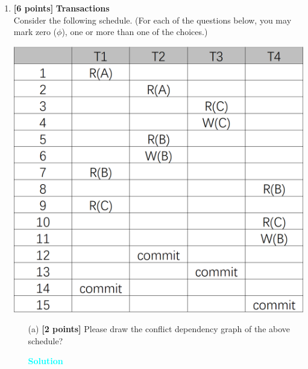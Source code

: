\documentclass[10pt]{article}
\newenvironment{solution}
    { \begin{mdframed}[backgroundcolor=gray!10] \textcolor{cyan}{\textbf{Solution}} \\}
    {  \end{mdframed}}
\begin{document}
\begin{enumerate}

	\item \textbf{[6 points]} \textbf{Transactions} \\
	      Consider the following schedule. (For each of the questions below, you may mark zero ($\phi$), one
	      or more than one of the choices.)
	      \begin{center}
		      \includegraphics[scale=0.35]{transaction}
	      \end{center}
	      \begin{itemize}
		      \item[(a)] \textbf{[2 points]} Please draw the conflict dependency graph of the above schedule?\\
		            \begin{solution}
			            \begin{center}

\end{center}
\end{solution}
\end{itemize}
\end{enumerate}
\end{document}
